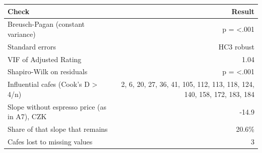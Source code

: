 \begin{tabular}{lr}
\toprule
Check & Result \\
\midrule
Breusch-Pagan (constant variance) & p = <.001 \\
Standard errors & HC3 robust \\
VIF of Adjusted Rating & 1.04 \\
Shapiro-Wilk on residuals & p = <.001 \\
Influential cafes (Cook's D > 4/n) & 2, 6, 20, 27, 36, 41, 105, 112, 113, 118, 124, 140, 158, 172, 183, 184 \\
Slope without espresso price (as in A7), CZK & -14.9 \\
Share of that slope that remains & 20.6\% \\
Cafes lost to missing values & 3 \\
\bottomrule
\end{tabular}
